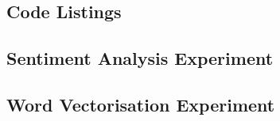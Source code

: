 \documentclass[12pt,a4paper]{article}
\begin{document}
\begin{appendices}
\section{Code Listings}
\begin{subappendices}
\subsection{Sentiment Analysis Experiment} \label{app:sentiment-analysis}


\subsection{Word Vectorisation Experiment} \label{app:vectorisation}

\end{subappendices}

\end{appendices}
\end{document}
